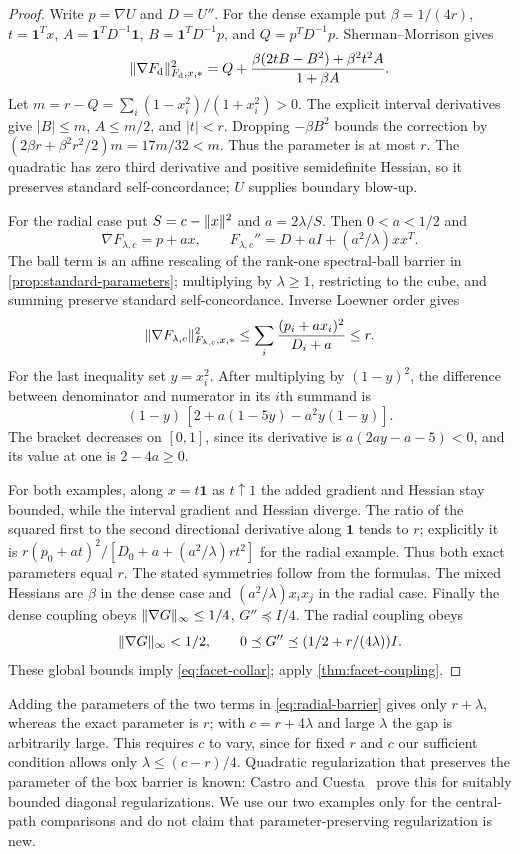 \begin{proof}
Write $p=\nabla U$ and $D=U''$. For the dense example put
$\beta=1/(4r)$, $t=\mathbf1^Tx$,
$A=\mathbf1^TD^{-1}\mathbf1$, $B=\mathbf1^TD^{-1}p$, and
$Q=p^TD^{-1}p$. Sherman--Morrison gives
\[
 \lVert \nabla F_{\mathrm d}\rVert_{F_{\mathrm d},x,*}^2
 =Q+\frac{\beta(2tB-B^2)+\beta^2t^2A}{1+\beta A}.
\]
Let $m=r-Q=\sum_i(1-x_i^2)/(1+x_i^2)>0$.
The explicit interval derivatives give $|B|\leq m$, $A\leq m/2$,
and $|t|<r$. Dropping $-\beta B^2$ bounds the correction by
$(2\beta r+\beta^2r^2/2)m=17m/32<m$.
Thus the parameter is at most $r$. The quadratic has zero third
derivative and positive semidefinite Hessian, so it preserves
standard self-concordance; $U$ supplies boundary blow-up.

For the radial case put $S=c-\lVert x\rVert^2$ and $a=2\lambda/S$.
Then $0<a<1/2$ and
\begin{equation}
 \nabla F_{\lambda,c}=p+ax,\qquad
 F_{\lambda,c}''=D+aI+(a^2/\lambda)xx^T.
 \label{eq:radial-derivatives}
\end{equation}
The ball term is an affine rescaling of the rank-one spectral-ball
barrier in \cref{prop:standard-parameters}; multiplying by
$\lambda\geq1$, restricting to the cube, and summing preserve
standard self-concordance. Inverse Loewner order gives
\[
 \lVert \nabla F_{\lambda,c}\rVert_{F_{\lambda,c},x,*}^2
 \leq\sum_i\frac{(p_i+ax_i)^2}{D_i+a}\leq r.
\]
For the last inequality set $y=x_i^2$. After multiplying by
$(1-y)^2$, the difference between denominator and numerator
in its $i$th summand is
\[
 (1-y)\,[2+a(1-5y)-a^2y(1-y)].
\]
The bracket decreases on $[0,1]$, since its derivative is
$a(2ay-a-5)<0$, and its value at one is $2-4a\geq0$.

For both examples, along $x=t\mathbf1$ as $t\uparrow1$ the
added gradient and Hessian stay bounded, while the interval gradient
and Hessian diverge. The ratio of the squared first to the second directional derivative
along $\mathbf1$ tends to $r$; explicitly it is
$r(p_0+at)^2/[D_0+a+(a^2/\lambda)rt^2]$ for the radial example.
Thus both exact parameters equal $r$.
The stated symmetries follow from the formulas. The mixed Hessians
are $\beta$ in the dense case and
$(a^2/\lambda)x_ix_j$ in the radial case.
Finally the dense coupling obeys
$\lVert \nabla G\rVert_\infty\leq1/4$, $G''\preceq I/4$.
The radial coupling obeys
\[
 \lVert \nabla G\rVert_\infty<1/2,\qquad
 0\preceq G''\preceq(1/2+r/(4\lambda))I.
\]
These global bounds imply \eqref{eq:facet-collar}; apply
\cref{thm:facet-coupling}.
\end{proof}
Adding the parameters of the two terms in \eqref{eq:radial-barrier}
gives only $r+\lambda$, whereas the exact parameter is $r$; with
$c=r+4\lambda$ and large $\lambda$ the gap is arbitrarily large. This
requires $c$ to vary, since for fixed $r$ and $c$ our sufficient
condition allows only $\lambda\leq(c-r)/4$.
Quadratic regularization that preserves the parameter of the box
barrier is known: Castro and Cuesta~\cite[Section 4.1]{CastroCuesta2011}
prove this for suitably bounded diagonal regularizations. We use our two examples only for the central-path comparisons and do
not claim that parameter-preserving regularization is new.

